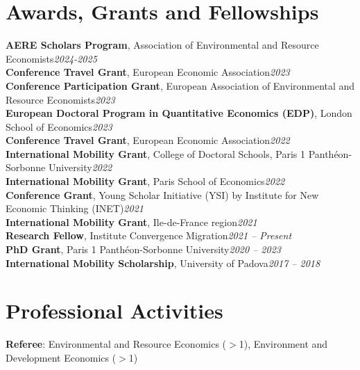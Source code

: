 \documentclass[letterpaper,11pt]{article}
\begin{document}
{\section{Awards, Grants and Fellowships}
   \begin{itemize}[leftmargin=0.15in, label={}]
    \small{\item{
	{\textbf{AERE Scholars Program}, Association of Environmental and Resource Economists}\hfill{\textit{2024-2025}} \\  
		{\textbf{Conference Travel Grant}, European Economic Association}\hfill{\textit{2023}} \\			{\textbf{Conference Participation Grant}, European Association of Environmental and Resource Economists}\hfill{\textit{2023}} \\    
	{\textbf{European Doctoral Program in Quantitative Economics (EDP)}, London School of Economics}\hfill{\textit{2023}}\\
	{\textbf{Conference Travel Grant}, European Economic Association}\hfill{\textit{2022}} \\
    {\textbf{International Mobility Grant}, College of Doctoral Schools, Paris 1 Panthéon-Sorbonne University}\hfill{\textit{2022}} \\
    	{\textbf{International Mobility Grant}, Paris School of Economics}\hfill{\textit{2022}} \\
	{\textbf{Conference Grant}, Young Scholar Initiative (YSI) by Institute for New Economic Thinking (INET)}\hfill{\textit{2021}} \\
	{\textbf{International Mobility Grant}, Ile-de-France region}\hfill{\textit{2021}} \\
	{\textbf{Research Fellow}, Institute Convergence Migration}\hfill{\textit{2021 -- Present}} \\

	{\textbf{PhD Grant}, Paris 1 Panthéon-Sorbonne University}\hfill{\textit{2020 -- 2023}} \\
	{\textbf{International Mobility Scholarship}, University of Padova}\hfill{\textit{2017 -- 2018}}\\
    }}
 \end{itemize}
          
          
\section{Professional Activities}
 \begin{itemize}[leftmargin=0.15in, label={}]
    \small{\item{
     \textbf{Referee}{: Environmental and Resource Economics ($>$1), Environment and Development Economics ($>$1)} \\
    }}
 \end{itemize}         
          

}
\end{document}
